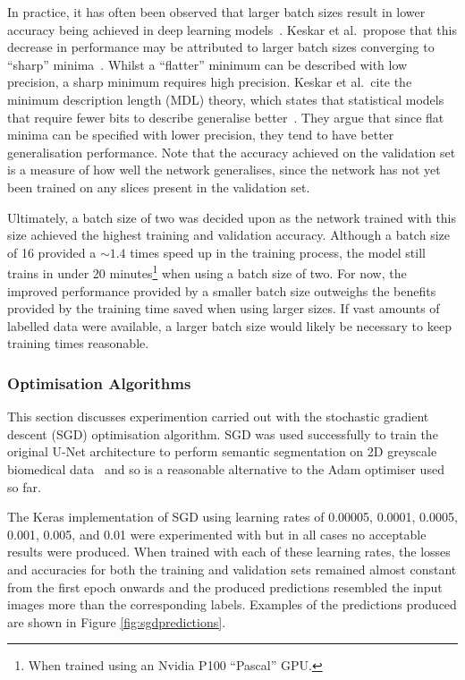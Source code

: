 In practice, it has often been observed that larger batch sizes result in lower accuracy being achieved in deep learning models~\cite{keskar2016large, smallbatch, largebatch}. Keskar et al.\ propose that this decrease in performance may be attributed to larger batch sizes converging to ``sharp'' minima~\cite{keskar2016large}. Whilst a ``flatter'' minimum can be described with low precision, a sharp minimum requires high precision. Keskar et al.\ cite the minimum description length (MDL) theory, which states that statistical models that require fewer bits to describe generalise better~\cite{rissanen}. They argue that since flat minima can be specified with lower precision, they tend to have better generalisation performance. Note that the accuracy achieved on the validation set is a measure of how well the network generalises, since the network has not yet been trained on any slices present in the validation set.

Ultimately, a batch size of two was decided upon as the network trained with this size achieved the highest training and validation accuracy. Although a batch size of 16 provided a ${\sim}1.4$ times speed up in the training process, the model still trains in under 20 minutes\footnote{When trained using an Nvidia P100 ``Pascal'' GPU.} when using a batch size of two. For now, the improved performance provided by a smaller batch size outweighs the benefits provided by the training time saved when using larger sizes. If vast amounts of labelled data were available, a larger batch size would likely be necessary to keep training times reasonable.

\subsubsection{Optimisation Algorithms}

This section discusses experimention carried out with the stochastic gradient descent (SGD) optimisation algorithm. SGD was used successfully to train the original U-Net architecture to perform semantic segmentation on 2D greyscale biomedical data~\cite{ronneberger2015u} and so is a reasonable alternative to the Adam optimiser used so far.

The Keras implementation of SGD using learning rates of 0.00005, 0.0001, 0.0005, 0.001, 0.005, and 0.01 were experimented with but in all cases no acceptable results were produced. When trained with each of these learning rates, the losses and accuracies for both the training and validation sets remained almost constant from the first epoch onwards and the produced predictions resembled the input images more than the corresponding labels. Examples of the predictions produced are shown in Figure \ref{fig:sgdpredictions}.

